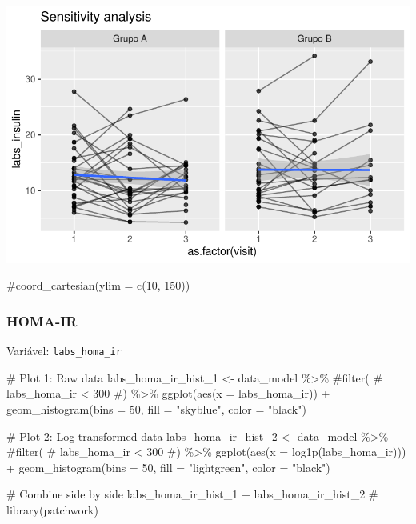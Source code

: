 \documentclass[
  12pt,
]{article}
\newenvironment{Shaded}{\begin{snugshade}}{\end{snugshade}}
\newcommand{\AttributeTok}[1]{\textcolor[rgb]{0.40,0.45,0.13}{#1}}
\newcommand{\CommentTok}[1]{\textcolor[rgb]{0.37,0.37,0.37}{#1}}
\newcommand{\DecValTok}[1]{\textcolor[rgb]{0.68,0.00,0.00}{#1}}
\newcommand{\FunctionTok}[1]{\textcolor[rgb]{0.28,0.35,0.67}{#1}}
\newcommand{\NormalTok}[1]{\textcolor[rgb]{0.00,0.23,0.31}{#1}}
\newcommand{\OtherTok}[1]{\textcolor[rgb]{0.00,0.23,0.31}{#1}}
\newcommand{\SpecialCharTok}[1]{\textcolor[rgb]{0.37,0.37,0.37}{#1}}
\newcommand{\StringTok}[1]{\textcolor[rgb]{0.13,0.47,0.30}{#1}}
\begin{document}
\includegraphics{Outcomes_files/figure-pdf/labs_insulin_6-2.pdf}

\begin{Shaded}
\begin{Highlighting}[]
    \CommentTok{\#coord\_cartesian(ylim = c(10, 150))}
\end{Highlighting}
\end{Shaded}

\subsubsection{HOMA-IR}\label{homa-ir}

Variável: \texttt{labs\_homa\_ir}

\begin{Shaded}
\begin{Highlighting}[]
\CommentTok{\# Plot 1: Raw data}
\NormalTok{labs\_homa\_ir\_hist\_1 }\OtherTok{\textless{}{-}}\NormalTok{ data\_model }\SpecialCharTok{\%\textgreater{}\%} 
    \CommentTok{\#filter(}
    \CommentTok{\#    labs\_homa\_ir \textless{} 300}
    \CommentTok{\#) \%\textgreater{}\% }
    \FunctionTok{ggplot}\NormalTok{(}\FunctionTok{aes}\NormalTok{(}\AttributeTok{x =}\NormalTok{ labs\_homa\_ir)) }\SpecialCharTok{+} 
    \FunctionTok{geom\_histogram}\NormalTok{(}\AttributeTok{bins =} \DecValTok{50}\NormalTok{, }\AttributeTok{fill =} \StringTok{"skyblue"}\NormalTok{, }\AttributeTok{color =} \StringTok{"black"}\NormalTok{)}

\CommentTok{\# Plot 2: Log{-}transformed data}
\NormalTok{labs\_homa\_ir\_hist\_2 }\OtherTok{\textless{}{-}}\NormalTok{ data\_model }\SpecialCharTok{\%\textgreater{}\%} 
    \CommentTok{\#filter(}
    \CommentTok{\#    labs\_homa\_ir \textless{} 300}
    \CommentTok{\#) \%\textgreater{}\%}
    \FunctionTok{ggplot}\NormalTok{(}\FunctionTok{aes}\NormalTok{(}\AttributeTok{x =} \FunctionTok{log1p}\NormalTok{(labs\_homa\_ir))) }\SpecialCharTok{+} 
    \FunctionTok{geom\_histogram}\NormalTok{(}\AttributeTok{bins =} \DecValTok{50}\NormalTok{, }\AttributeTok{fill =} \StringTok{"lightgreen"}\NormalTok{, }\AttributeTok{color =} \StringTok{"black"}\NormalTok{)}

\CommentTok{\# Combine side by side}
\NormalTok{labs\_homa\_ir\_hist\_1 }\SpecialCharTok{+}\NormalTok{ labs\_homa\_ir\_hist\_2 }\CommentTok{\# library(patchwork)}
\end{Highlighting}
\end{Shaded}
\end{document}
